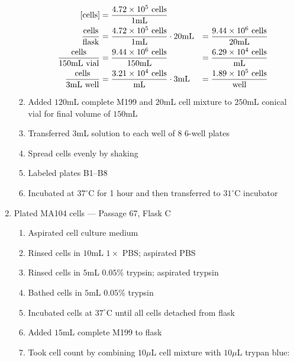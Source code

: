 \begin{enumerate}
\begin{enumerate}
				\begin{align*}
				\text{[cells]} &= \frac{4.72\times 10^{5}\text{ cells}}{1\text{mL}} \\
				\frac{\text{cells}}{\text{flask}} &= \frac{4.72\times 10^{5}\text{ cells}}{1\text{mL}} \cdot 20\text{mL} &= \frac{9.44\times 10^{6}\text{ cells}}{20\text{mL}}\\
				\frac{\text{cells}}{150\text{mL vial}} &= \frac{9.44\times 10^{6}\text{ cells}}{150\text{mL}} &= \frac{6.29\times 10^{4}\text{ cells}}{\text{mL}}\\
				\frac{\text{cells}}{3\text{mL well}} &= \frac{3.21\times 10^{4}\text{ cells}}{\text{mL}} \cdot 3\text{mL} &= \frac{1.89\times 10^{5}\text{ cells}}{\text{well}}\\
				\end{align*}
			\item Added $120$mL complete M199 and $20$mL cell mixture to $250$mL conical vial for final volume of $150$mL
			\item Transferred $3$mL solution to each well of 8 6-well plates
			\item Spread cells evenly by shaking
			\item Labeled plates B1--B8
			\item Incubated at $37^{\circ}$C for 1 hour and then transferred to $31^{\circ}$C incubator
		\end{enumerate}
	\item Plated MA104 cells --- Passage 67, Flask C
		\begin{enumerate}
			\item Aspirated cell culture medium
			\item Rinsed cells in $10$mL $1\times$ PBS; aspirated PBS
			\item Rinsed cells in $5$mL $0.05$\% trypsin; aspirated trypsin
			\item Bathed cells in $5$mL $0.05$\% trypsin
			\item Incubated cells at $37^{\circ}$C until all cells detached from flask
			\item Added $15$mL complete M199 to flask
			\item Took cell count by combining $10\mu$L cell mixture with $10\mu$L trypan blue:
			

\end{enumerate}
\end{enumerate}
